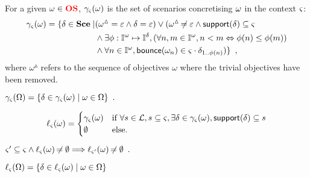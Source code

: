 \begin{definition}[$\concr: \OS \mapsto \powerset(\Sce)$]
\label{def:concr}
  For a given $\omega \in \textcolor{red}{\mathbf{OS}}$, $\gamma_\varsigma(\omega)$ is the set of scenarios concretising $\omega$ in the context $\varsigma$:
  \begin{align*}
    \gamma_\varsigma(\omega) = \{ \delta \in \mathbf{Sce} \mid & (\omega^\vartriangle = \varepsilon \wedge \delta = \varepsilon) 
      \vee (\omega^\vartriangle \not\nobreak\mkern -2mu = \varepsilon \wedge \mathsf{support}(\delta) \subseteq \varsigma
    \\ &
      \wedge \exists \phi:\mathbb{I}^{\omega} \mapsto \mathbb{I}^{\delta}, (\forall n, m \in \mathbb{I}^{\omega}, n < m \Leftrightarrow \phi(n) \leq \phi(m)) 
    \\ &
      \wedge \forall n \in \mathbb{I}^{\omega}, \mathsf{bounce}(\omega_n) \in \varsigma \cdot \delta_{1..\phi(n)})
    \}
    \enspace,
  \end{align*}
  where $\omega^\vartriangle$ refers to the sequence of objectives $\omega$ where the trivial objectives have been removed.
\end{definition}
%
\begin{definition}[$\concr: \powerset(\OS) \mapsto \powerset(\Sce)$]
\label{def:concr-set}
  $\gamma_\varsigma(\Omega) = \{ \delta \in \gamma_\varsigma(\omega) \mid \omega \in \Omega \} \enspace.$
\end{definition}

\begin{definition}[$\uconcr: \OS \mapsto \powerset(\Sce)$]
\label{def:uconcr}
  \[
  \ell_\varsigma(\omega) = 
  \begin{cases}
    \gamma_\varsigma(\omega) & \text{if } \forall s \in \mathcal{L}, s \subseteq \varsigma, \exists \delta \in \gamma_\varsigma(\omega), \mathsf{support}(\delta) \subseteq s \\
    \emptyset & \text{else.}
  \end{cases}
  \]
\end{definition}
% 
\begin{theorem}
\label{th:uconcr-ctx}
  $\varsigma' \subseteq \varsigma \wedge \ell_\varsigma(\omega) \not\nobreak\mkern -2mu = \emptyset \Longrightarrow \ell_{\varsigma'}(\omega) \not\nobreak\mkern -2mu = \emptyset \enspace.$
\end{theorem}
% 
\begin{definition}[$\uconcr: \powerset(\OS) \mapsto \powerset(\Sce)$]
\label{def:uconcr-set}
  $\ell_\varsigma(\Omega) = \{ \delta \in \ell_\varsigma(\omega) \mid \omega \in \Omega\}$
\end{definition}






